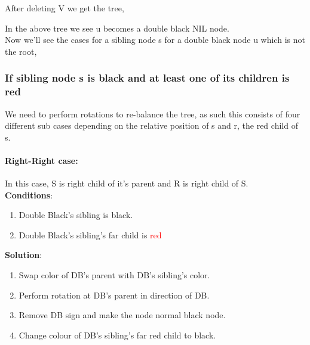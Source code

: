\documentclass{article}
\begin{document}
\begin{center}
\end{center}
After deleting V we get the tree,
\begin{center}
\end{center}
In the above tree we see u becomes a double black NIL node.\\
Now we'll see the cases for a sibling node s for a double black node u which is not the root,
\subsubsection{If sibling node s is black and at least one of its children is red}
We need to perform rotations to re-balance the tree, as such this consists of four different sub cases depending on the relative position of s and r, the red child of s.
\paragraph{Right-Right case:}
In this case, S is right child of it's parent and R is right child of S.\\
\textbf{Conditions}:
\begin{enumerate}
    \item Double Black's sibling is black.
    \item Double Black's sibling's far child is \textcolor{red}{red}
\end{enumerate}
\textbf{Solution}:
\begin{enumerate}
    \item Swap color of DB's parent with DB's sibling's color.
    \item Perform rotation at DB's parent in direction of DB.
    \item Remove DB sign and make the node normal black node.
    \item Change colour of DB's sibling's far red child to black.
\end{enumerate}
\end{document}
